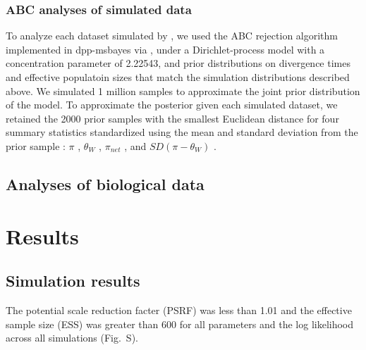 \documentclass[letterpaper,12pt]{article}
\begin{document}
\subsubsection{ABC analyses of simulated data}

To analyze each dataset simulated by \pymsbayes, we used the ABC rejection
algorithm implemented in dpp-msbayes via \pymsbayes \citep[Version 0.3.7,
Commit 54f720df;][]{Oaks2014dpp},
under a Dirichlet-process model with a concentration parameter of 2.22543, and
prior distributions on divergence times and effective populatoin sizes that
match the simulation distributions described above.
We simulated 1 million samples to approximate the joint prior distribution of
the model.
To approximate the posterior given each simulated dataset, we retained the 2000
prior samples with the smallest Euclidean distance for four summary statistics
standardized using the mean and standard deviation from the prior sample
\citep{Oaks2014dpp}:
$\pi$ \cite{Tajima1983}, $\theta_W$ \cite{Watterson1975}, $\pi_{net}$
\cite{Takahata1985}, and $SD(\pi-\theta_W)$ \cite{Tajima1989}.

\subsection{Analyses of biological data}

\section{Results}

\subsection{Simulation results}

The potential scale reduction facter (PSRF) was less than 1.01 and the
effective sample size (ESS) was greater than 600 for all parameters and the log
likelihood across all simulations
(Fig.\ S).
\end{document}
